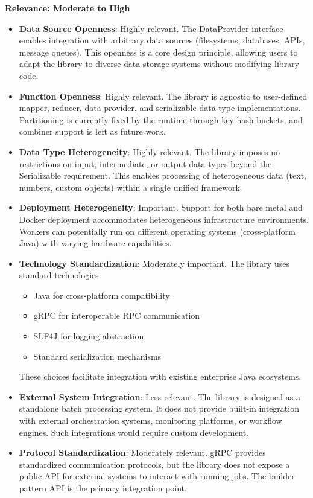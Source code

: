 \documentclass{scrartcl}
\begin{document}
\textbf{Relevance: Moderate to High}

\begin{itemize}
    \item \textbf{Data Source Openness}: Highly relevant. The DataProvider interface enables integration with arbitrary data sources (filesystems, databases, APIs, message queues). This openness is a core design principle, allowing users to adapt the library to diverse data storage systems without modifying library code.

    \item \textbf{Function Openness}: Highly relevant. The library is agnostic to user-defined mapper, reducer, data-provider, and serializable data-type implementations. Partitioning is currently fixed by the runtime through key hash buckets, and combiner support is left as future work.

    \item \textbf{Data Type Heterogeneity}: Highly relevant. The library imposes no restrictions on input, intermediate, or output data types beyond the Serializable requirement. This enables processing of heterogeneous data (text, numbers, custom objects) within a single unified framework.

    \item \textbf{Deployment Heterogeneity}: Important. Support for both bare metal and Docker deployment accommodates heterogeneous infrastructure environments. Workers can potentially run on different operating systems (cross-platform Java) with varying hardware capabilities.

    \item \textbf{Technology Standardization}: Moderately important. The library uses standard technologies:
          \begin{itemize}
              \item Java for cross-platform compatibility
              \item gRPC for interoperable RPC communication
              \item SLF4J for logging abstraction
              \item Standard serialization mechanisms
          \end{itemize}
          These choices facilitate integration with existing enterprise Java ecosystems.

    \item \textbf{External System Integration}: Less relevant. The library is designed as a standalone batch processing system. It does not provide built-in integration with external orchestration systems, monitoring platforms, or workflow engines. Such integrations would require custom development.

    \item \textbf{Protocol Standardization}: Moderately relevant. gRPC provides standardized communication protocols, but the library does not expose a public API for external systems to interact with running jobs. The builder pattern API is the primary integration point.
\end{itemize}
\end{document}
